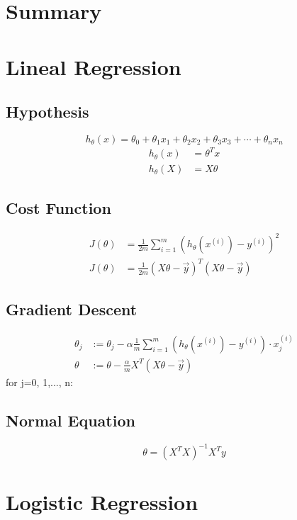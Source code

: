 \newpage
\section{Summary}
\section*{Lineal Regression}
\subsection*{Hypothesis}
\begin{equation}
h_\theta (x) = \theta_0 + \theta_1 x_1 + \theta_2 x_2 + \theta_3 x_3 + \cdots + \theta_n x_n 
\end{equation}
\begin{align}
h_\theta(x) &= \theta^T x \\
h_\theta(X) &= X\theta 
\end{align}
\subsection*{Cost Function}
\begin{align}
J(\theta) &= \frac{1}{2m} \sum_{i=1}^m \left(h_\theta (x^{(i)}) - y^{(i)} \right)^2 \\
J(\theta) &= \frac{1}{2m} (X\theta - \vec{y})^T (X\theta - \vec{y})
\end{align}
\subsection*{Gradient Descent}
\begin{align}
\theta_j &:= \theta_j - \alpha \frac{1}{m} \sum\limits_{i=1}^{m} (h_\theta(x^{(i)}) - y^{(i)}) \cdot x_j^{(i)} \\
\theta &:= \theta - \frac{\alpha}{m}X^T (X\theta - \vec{y})
\end{align}
for j=0, 1,..., n:
\subsection*{Normal Equation}
\begin{equation}
\theta=(X^TX)^{-1}X^Ty
\end{equation}
\section*{Logistic Regression}
